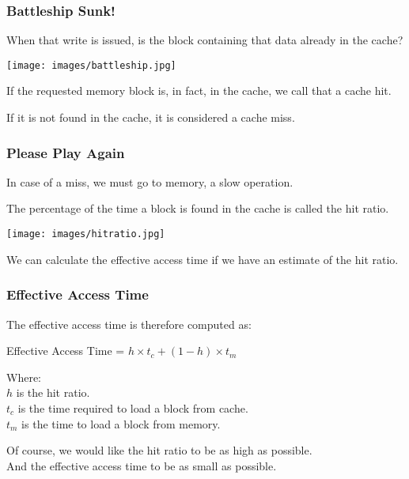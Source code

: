 \begin{frame}
\frametitle{Battleship Sunk!}

When that write is issued, is the block containing that data already in the cache?

\begin{center}
	\texttt{[image: images/battleship.jpg]}
\end{center}

If the requested memory block is, in fact,  in the cache, we call that a cache \alert{hit}.

If it is not found in the cache, it is considered a cache \alert{miss}. 

\end{frame}

\begin{frame}
\frametitle{Please Play Again}

In case of a miss, we must go to memory, a slow operation. 


The percentage of the time a block is found in the cache is called the \alert{hit ratio}.

\begin{center}
	\texttt{[image: images/hitratio.jpg]}
\end{center}

We can calculate the \alert{effective access time} if we have an estimate of the hit ratio.

\end{frame}

\begin{frame}
\frametitle{Effective Access Time}

The effective access time is therefore computed as:

\begin{center}
Effective Access Time = $h \times t_{c} + (1-h) \times t_{m}$
\end{center}

Where:\\
\quad $h$ is the hit ratio.\\
\quad $t_{c}$ is the time required to load a block from cache.\\
\quad $t_{m}$ is the time to load a block from memory. 


Of course, we would like the hit ratio to be as high as possible.\\
\quad And the effective access time to be as small as possible.

\end{frame}

